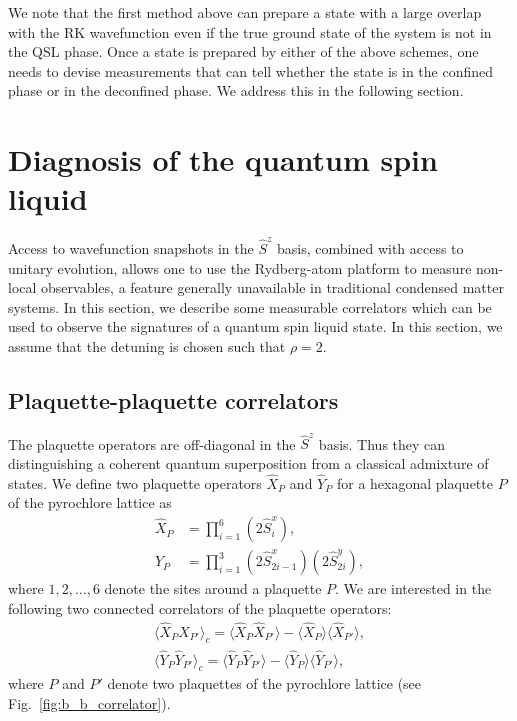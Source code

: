 \documentclass[twocolumn,superscriptaddress,amsmath,amssymb,aps,prx,nofootinbib]{revtex4-2}
\begin{document}
We note that the first method above can prepare a state with a large overlap with the RK wavefunction even if the true ground state of the system is not in the QSL phase.
Once a state is prepared by either of the above schemes, one needs to devise measurements that can tell whether the state is in the confined phase or in the deconfined phase. We address this in the following section.

\section{Diagnosis of the quantum spin liquid}\label{sec:diagnostics}
Access to wavefunction snapshots in the $\hat{S}^z$ basis, combined with access to unitary evolution, allows one to use the Rydberg-atom platform to measure non-local observables, a feature generally unavailable in traditional condensed matter systems. In this section, we describe some measurable correlators which can be used to observe the signatures of a quantum spin liquid state. In this section, we  assume that the detuning is chosen such that $\rho = 2$.



\subsection{Plaquette-plaquette correlators}

The plaquette operators are  off-diagonal in the $\hat{S}^z$ basis. Thus they can distinguishing a coherent quantum superposition from a classical admixture of states. We define two plaquette operators $\hat{X}_P$ and $\hat{Y}_P$ for a hexagonal plaquette $P$ of the pyrochlore lattice as 
 \begin{equation} \label{eq:xp_yp_def}
  \begin{aligned}
    \hat{X}_{P} &=  \prod_{i =1}^{6} \left( 2\hat{S}_i^x \right) ,\\
    \hat{Y}_{P} & = \prod_{i = 1}^{3} \left( 2\hat{S}_{2i-1}^x \right) \left( 2\hat{S}_{2i}^y \right),
\end{aligned}
\end{equation}
where $1,2,\ldots,6$ denote the sites around a plaquette $P$. We are interested in the following two connected correlators of the plaquette operators:
\begin{equation}
\begin{aligned}
\label{eq:conn_corr_x_y}
    \langle \hat{X}_{P} \hat{X}_{P'} \rangle_c = \langle \hat{X}_P \hat{X}_{P'} \rangle - \langle \hat{X}_P \rangle \langle \hat{X}_{P'} \rangle,\\
    \langle \hat{Y}_P \hat{Y}_{P'} \rangle_c = \langle \hat{Y}_P \hat{Y}_{P'} \rangle - \langle \hat{Y}_P  \rangle \langle  \hat{Y}_{P'} \rangle,
\end{aligned}
\end{equation}
where $P$ and $P'$ denote two plaquettes of the pyrochlore lattice (see Fig.~\ref{fig:b_b_correlator}).
\end{document}
